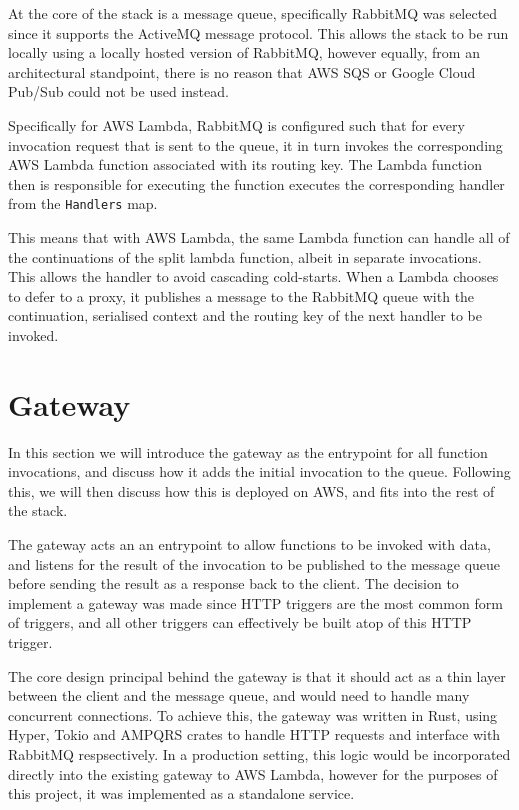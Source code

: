 At the core of the \faaas{} stack is a message queue, specifically RabbitMQ was selected since it supports the ActiveMQ message protocol. This allows the \faaas{} stack to be run locally using a locally hosted version of RabbitMQ, however equally, from an architectural standpoint, there is no reason that AWS SQS or Google Cloud Pub/Sub could not be used instead.

Specifically for AWS Lambda, RabbitMQ is configured such that for every invocation request that is sent to the queue, it in turn invokes the corresponding AWS Lambda function associated with its routing key. The Lambda function then is responsible for executing the function executes the corresponding handler from the \verb|Handlers| map.

This means that with AWS Lambda, the same Lambda function can handle all of the continuations of the split lambda function, albeit in separate invocations. This allows the handler to avoid cascading cold-starts. When a Lambda chooses to defer to a proxy, it publishes a message to the RabbitMQ queue with the continuation, serialised context and the routing key of the next handler to be invoked.

\section{Gateway}
In this section we will introduce the gateway as the entrypoint for all function invocations, and discuss how it adds the initial invocation to the queue. Following this, we will then discuss how this is deployed on AWS, and fits into the rest of the stack.

The gateway acts an an entrypoint to allow functions to be invoked with data, and listens for the result of the invocation to be published to the message queue before sending the result as a response back to the client. The decision to implement a gateway was made since HTTP triggers are the most common form of triggers\cite{eismannReviewServerlessUse2020}, and all other triggers can effectively be built atop of this HTTP trigger.

The core design principal behind the gateway is that it should act as a thin layer between the client and the message queue, and would need to handle many concurrent connections. To achieve this, the gateway was written in Rust, using Hyper, Tokio and AMPQRS crates to handle HTTP requests and interface with RabbitMQ respsectively. In a production setting, this logic would be incorporated directly into the existing gateway to AWS Lambda, however for the purposes of this project, it was implemented as a standalone service.

